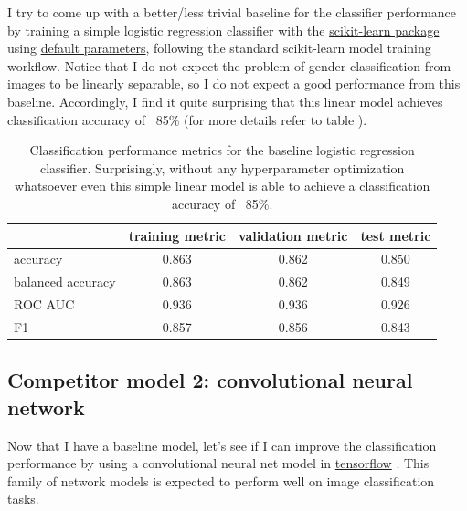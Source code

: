 \documentclass{article}
\begin{document}
I try to come up with a better/less trivial baseline for the classifier performance by training a simple logistic regression classifier with the \href{https://scikit-learn.org}{scikit-learn package} \citep{pedregosa2011scikit} using \href{https://scikit-learn.org/stable/modules/generated/sklearn.linear_model.LogisticRegression.html}{default parameters}, following the standard scikit-learn model training workflow. Notice that I do not expect the problem of gender classification from images to be linearly separable, so I do not expect a good performance from this baseline. Accordingly, I find it quite surprising that this linear model achieves classification accuracy of ~85\% (for more details refer to table ).

\begin{table}[h!]
\begin{center}
\caption{Classification performance metrics for the baseline logistic regression classifier. Surprisingly, without any hyperparameter optimization whatsoever even this simple linear model is able to achieve a classification accuracy of ~85\%.}
\label{tab:LogRegPerformance}
\begin{tabular}{| l | c | c | c | }
\hline\hline
&training metric& validation metric & test metric\\
\hline\hline
accuracy&0.863&0.862&0.850\\
balanced accuracy&0.863&0.862&0.849\\
ROC AUC&0.936&0.936&0.926\\
F1&0.857&0.856&0.843\\
\hline\hline
\end{tabular}
\end{center}
\end{table}

\subsection{Competitor model 2: convolutional neural network}
Now that I have a baseline model, let's see if I can improve the classification performance by using a convolutional neural net model in \href{https://www.tensorflow.org}{tensorflow} \citep{tensorflow2015-whitepaper}. This family of network models is expected to perform well on image classification tasks. 
\end{document}
